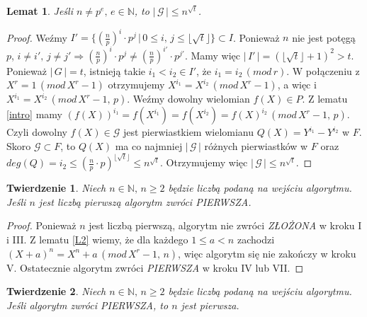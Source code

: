 \documentclass[declaration,shortabstract]{iithesis}
\theoremstyle{definition}
\theoremstyle{remark} \newtheorem{observation}{Obserwacja}
\theoremstyle{plain} \newtheorem{theorem}{Twierdzenie}
\theoremstyle{plain} \newtheorem{lemma}{Lemat}
\theoremstyle{remark} \newtheorem*{remark*}{Uwaga}
\theoremstyle{reminder} \newtheorem*{reminder*}{Przypomnienie}
\begin{document}
\begin{lemma} \label{upper}
	Jeśli $n \neq p^e, \, e \in \mathbb{N}$, to $| \, \mathcal{G} \, | \leq n^{\sqrt{t}}$.
\end{lemma}
	
\begin{proof}
	Weźmy $I' = \{(\frac{n}{p})^i \cdot p^j \, | \, 0 \leq i, \, j \leq \lfloor \sqrt{t} \rfloor \} \subset I$. Ponieważ $n$ nie jest potęgą $p$, $i \neq i', \, j \neq j' \Rightarrow (\frac{n}{p})^i \cdot p^j \neq (\frac{n}{p})^{i'} \cdot p^{j'}$. Mamy więc $| \, I' \, | = (\lfloor \sqrt{t} \rfloor + 1)^2 > t$. Ponieważ $| \, G \, | = t$, istnieją takie $i_1 < i_2 \in I'$, że $i_1 = i_2 \, (mod \, r)$. W połączeniu z $X^r = 1 \, (mod \, X^r - 1)$ otrzymujemy $X^{i_1} = X^{i_2} \, (mod \, X^r - 1)$, a więc i $X^{i_1} = X^{i_2} \, (mod \, X^r - 1, \, p)$.  Weźmy dowolny wielomian $f(X) \in P$. Z lematu \ref{intro} mamy $(f(X))^{i_1} = f(X^{i_1}) = f(X^{i_2}) = f(X)^{i_2} \, (mod \,  X^r - 1, \, p)$. Czyli dowolny $f(X) \in \mathcal{G}$ jest pierwiastkiem wielomianu $Q(X) = Y^{i_1} - Y^{i_2}$ w $F$. Skoro $\mathcal{G} \subset F$, to $Q(X)$ ma co najmniej $| \, \mathcal{G} \, |$ różnych pierwiastków w $F$ oraz $deg(Q) = i_2 \leq (\frac{n}{p} \cdot p)^{\lfloor \sqrt{t} \rfloor} \leq n^{\sqrt{t}}$. Otrzymujemy więc $| \, \mathcal{G} \, | \leq n^{\sqrt{t}}$.
\end{proof}
	
\begin{theorem}
	Niech $n \in \mathbb{N}, \, n \geq 2$ będzie liczbą podaną na wejściu algorytmu. Jeśli $n$ jest liczbą pierwszą algorytm zwróci \textit{PIERWSZA}.
\end{theorem}
	
\begin{proof}
	Ponieważ $n$ jest liczbą pierwszą, algorytm nie zwróci \textit{ZŁOŻONA} w kroku I i III. Z lematu \ref{L2} wiemy, że dla każdego $1 \leq a < n$ zachodzi $(X + a)^n = X^n + a \, (mod \, X^r - 1, \, n)$, więc algorytm się nie zakończy w kroku V. Ostatecznie algorytm zwróci \textit{PIERWSZA} w kroku IV lub VII.
\end{proof}
	
\begin{theorem}\label{T1}
	Niech $n \in \mathbb{N}, \, n \geq 2$ będzie liczbą podaną na wejściu algorytmu. Jeśli algorytm zwróci \textit{PIERWSZA}, to $n$ jest pierwsza.
\end{theorem}
	
\end{document}
